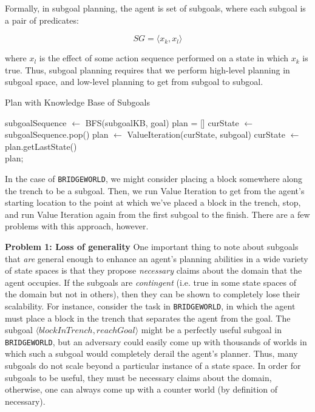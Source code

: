 \documentclass[]{article}
\begin{document}
Formally, in subgoal planning, the agent is set of subgoals, where each subgoal is a pair of predicates:

\[ 
SG = \langle x_k, x_l \rangle
\]

where $x_l$ is the effect of some action sequence performed on a state in which $x_k$ is true. Thus, subgoal planning requires that we perform high-level planning in subgoal space, and low-level planning to get from subgoal to subgoal.


\begin{algorithm}
  \caption{Plan with Knowledge Base of Subgoals}
  \begin{algorithmic}[1]
    \State subgoalSequence $\gets$ BFS(subgoalKB, goal)
    \State plan = []
    \State curState $\gets$ subgoalSequence.pop()
    		\State plan $\gets$ ValueIteration(curState, subgoal)
		\State curState $\gets$ plan.getLastState()
    \EndFor \\
    \Return plan;
  \end{algorithmic}
\end{algorithm}

In the case of \texttt{BRIDGEWORLD}, we might consider placing a block somewhere along the trench to be a subgoal. Then, we run Value Iteration to get from the agent's starting location to the point at which we've placed a block in the trench, stop, and run Value Iteration again from the first subgoal to the finish. There are a few problems with this approach, however.


{\bf Problem 1: Loss of generality}  One important thing to note about subgoals that {\it are} general enough to enhance an agent's planning abilities in a wide variety of state spaces is that they propose {\it necessary} claims about the domain that the agent occupies. If the subgoals are {\it contingent} (i.e. true in some state spaces of the domain but not in others), then they can be shown to completely lose their scalability. For instance, consider the task in \texttt{BRIDGEWORLD}, in which the agent must place a block in the trench that separates the agent from the goal. The subgoal $\langle blockInTrench, reachGoal\rangle$ might be a perfectly useful subgoal in \texttt{BRIDGEWORLD}, but an adversary could easily come up with thousands of worlds in which such a subgoal would completely derail the agent's planner. Thus, many subgoals do not scale beyond a particular instance of a state space. In order for subgoals to be useful, they must be necessary claims about the domain, otherwise, one can always come up with a counter world (by definition of necessary). 
\end{document}
